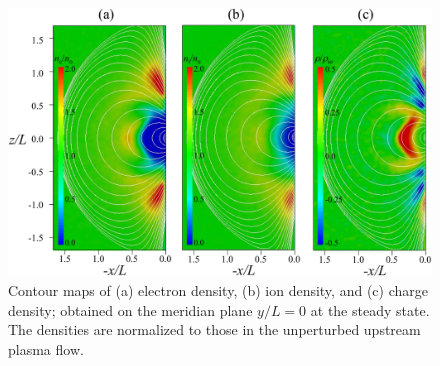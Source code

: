 \documentclass[draft,jgrga]{agutex2015}
\begin{document}
\begin{article}
\begin{figure}[t]
\centering
\noindent\includegraphics[width=15cm]{./figures/Fig_2_bb-crop.pdf}
\caption{Contour maps of (a) electron density, (b) ion density, and (c) charge density; 
obtained on the meridian plane $y/L=0$ at the steady state. The densities are normalized
to those in the unperturbed upstream plasma flow.}\label{fig:2}
\end{figure}


\end{article}
\end{document}
